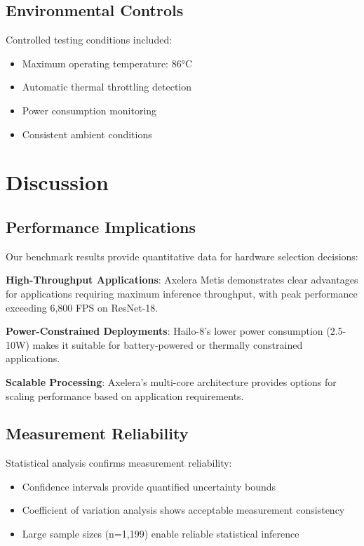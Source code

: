 \documentclass[journal]{IEEEtran}
\begin{document}
\subsection{Environmental Controls}

Controlled testing conditions included:
\begin{itemize}
    \item Maximum operating temperature: 86°C
    \item Automatic thermal throttling detection
    \item Power consumption monitoring
    \item Consistent ambient conditions
\end{itemize}

\section{Discussion}

\subsection{Performance Implications}

Our benchmark results provide quantitative data for hardware selection decisions:

\textbf{High-Throughput Applications}: Axelera Metis demonstrates clear advantages for applications requiring maximum inference throughput, with peak performance exceeding 6,800 FPS on ResNet-18.

\textbf{Power-Constrained Deployments}: Hailo-8's lower power consumption (2.5-10W) makes it suitable for battery-powered or thermally constrained applications.

\textbf{Scalable Processing}: Axelera's multi-core architecture provides options for scaling performance based on application requirements.

\subsection{Measurement Reliability}

Statistical analysis confirms measurement reliability:
\begin{itemize}
    \item Confidence intervals provide quantified uncertainty bounds
    \item Coefficient of variation analysis shows acceptable measurement consistency
    \item Large sample sizes (n=1,199) enable reliable statistical inference
\end{itemize}
\end{document}
